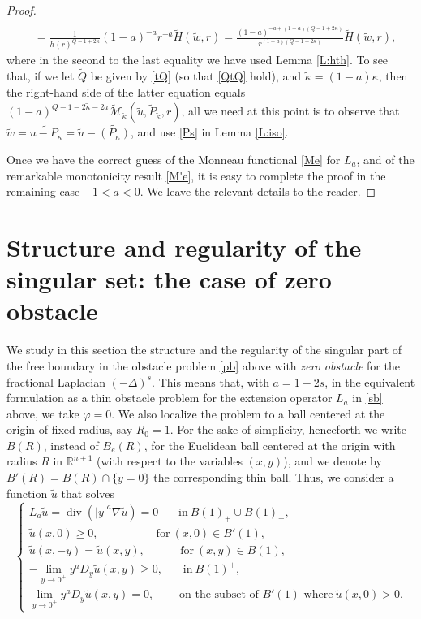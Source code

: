 \documentclass[11pt]{amsart}
\theoremstyle{plain}
\numberwithin{equation}{section}
\begin{document}
\begin{proof}
\begin{align*}
\\
& = \frac{1}{h(r)^{Q-1+2\kappa}} (1-a)^{-a} r^{-a} \tilde H(\tilde w,r) = \frac{(1-a)^{-a+(1-a)(Q-1+2\kappa)}}{r^{(1-a)(Q-1+2\kappa)}} \tilde H(\tilde w,r),
\end{align*}
where in the second to the last equality we have used Lemma \ref{L:hth}. To see that, if we let $\tilde Q$ be given by \eqref{tQ}  (so that \eqref{QtQ} hold), and $\tilde \kappa = (1-a)\kappa$, then the right-hand side of the latter equation equals $(1-a)^{\tilde Q - 1 - 2 \tilde \kappa - 2a} \tilde{\mathcal M}_{\tilde \kappa}(\tilde u,\tilde P_{\tilde \kappa},r)$, all we need at this point is to observe that $\tilde w = \widetilde{u-P_\kappa} = \tilde u - \widetilde{(P_\kappa)}$, and use \eqref{Ps} in Lemma \ref{L:iso}.

Once we have the correct guess of the Monneau functional \eqref{Me} for $L_a$, and of the remarkable monotonicity result \eqref{M'e},   it is easy to complete the  proof in the remaining case $-1<a<0$. We leave the relevant details to the reader.

\end{proof}

\section{Structure and regularity of the singular set: the case of zero obstacle}
\label{sec4}

We study in this section the structure and the regularity of the singular part of the free boundary in the obstacle problem \eqref{pb} above with \emph{zero obstacle} for the fractional  Laplacian $(-\Delta)^s$. This means that, with $a = 1-2s$, in the equivalent formulation as a thin obstacle problem for the extension operator $L_a$ in \eqref{sb} above, we take ${\varphi} = 0$. We also localize the problem to a ball centered at the origin of fixed radius, say $R_0 = 1$. For the sake of simplicity, henceforth we write $B(R)$, instead of $B_e(R)$, for the Euclidean ball centered at the origin with radius $R$ in ${\mathbb R}^{n+1}$ (with respect to the variables $(x,y)$), and we denote by $B'(R) = B(R)\cap \{y=0\}$ the corresponding thin ball. Thus, we consider a function $\tilde u$ that solves
\begin{equation}\label{obst-0}
\begin{cases}
L_a \tilde u = \operatorname{div}(|y|^a \nabla \tilde u) = 0\ \ \ \ \ \ \ \ \text{in}\ B(1)_+\cup B(1)_-,
\\
\tilde u(x,0) \ge 0,\ \ \ \ \ \ \ \ \ \ \ \ \ \ \ \ \ \ \ \ \ \ \  \text{for}\ (x,0)\in B'(1),
\\
\tilde u(x,-y) = \tilde u(x,y),\ \ \ \ \ \ \ \ \ \  \ \ \ \  \text{for}\ (x,y)\in B(1),
\\
- \underset{y\to 0^+}{\lim} y^a D_y\tilde u(x,y) \ge 0, \ \ \ \ \  \ \ \  \text{in}\ B(1)^+,
\\
\underset{y\to 0^+}{\lim} y^a D_y \tilde u(x,y) = 0, \ \ \ \ \ \ \ \ \ \ \text{on the subset of $B'(1)$ where}\ \tilde u(x,0) > 0.
\end{cases}
\end{equation}
\end{document}
